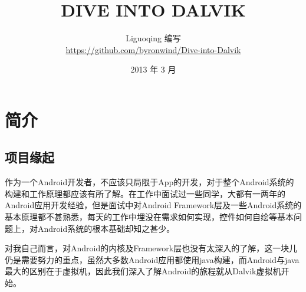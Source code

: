\documentclass[UTF8,winfonts]{article}
\begin{document}
\title{%
  {\huge {DIVE INTO DALVIK}\\\smallskip}%
 }

\author{Liguoqing 编写 \\[3mm]
        \url{https://github.com/byronwind/Dive-into-Dalvik}
       }

\date{2013 年 3 月}

\maketitle

\begin{multicols}{2}
\tableofcontents
\end{multicols}

\section{简介}
\label{sec:intro}

\subsection{项目缘起}
作为一个Android开发者，不应该只局限于App的开发，对于整个Android系统的构建和工作原理都应该有所了解。在工作中面试过一些同学，大都有一两年的Android应用开发经验，但是面试中对Android Framework层及一些Android系统的基本原理都不甚熟悉，每天的工作中埋没在需求如何实现，控件如何自绘等基本问题上，对Android系统的根本基础却知之甚少。

对我自己而言，对Android的内核及Framework层也没有太深入的了解，这一块儿仍是需要努力的重点，虽然大多数Android应用都使用java构建，而Android与java最大的区别在于虚拟机，因此我们深入了解Android的旅程就从Dalvik虚拟机开始。
\end{document}
